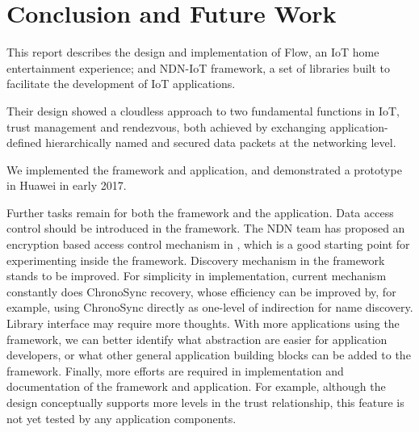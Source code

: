 \section{Conclusion and Future Work}
\label{sec:conclusion}

This report describes the design and implementation of Flow, an IoT home entertainment experience; and NDN-IoT framework, a set of libraries built to facilitate the development of IoT applications.

Their design showed a cloudless approach to two fundamental functions in IoT, trust management and rendezvous, both achieved by exchanging application-defined hierarchically named and secured data packets at the networking level.

We implemented the framework and application, and demonstrated a prototype in Huawei in early 2017.

Further tasks remain for both the framework and the application. 
Data access control should be introduced in the framework. The NDN team has proposed an encryption based access control mechanism in \cite{nac}, which is a good starting point for experimenting inside the framework.
Discovery mechanism in the framework stands to be improved. For simplicity in implementation, current mechanism constantly does ChronoSync recovery, whose efficiency can be improved by, for example, using ChronoSync directly as one-level of indirection for name discovery.
Library interface may require more thoughts. With more applications using the framework, we can better identify what abstraction are easier for application developers, or what other general application building blocks can be added to the framework.
Finally, more efforts are required in implementation and documentation of the framework and application. For example, although the design conceptually supports more levels in the trust relationship, this feature is not yet tested by any application components.